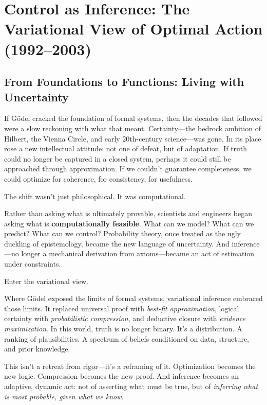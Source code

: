 






\section{Control as Inference: The Variational View of Optimal Action (1992--2003)}

\subsection{From Foundations to Functions: Living with Uncertainty}

If Gödel cracked the foundation of formal systems, then the decades that followed were a slow reckoning with what that meant. Certainty—the bedrock ambition of Hilbert, the Vienna Circle, and early 20th-century science—was gone. In its place rose a new intellectual attitude: not one of defeat, but of adaptation. If truth could no longer be captured in a closed system, perhaps it could still be approached through approximation. If we couldn’t guarantee completeness, we could optimize for coherence, for consistency, for usefulness.

The shift wasn’t just philosophical. It was computational.

Rather than asking what is ultimately provable, scientists and engineers began asking what is \textbf{computationally feasible}. What can we model? What can we predict? What can we control? Probability theory, once treated as the ugly duckling of epistemology, became the new language of uncertainty. And inference—no longer a mechanical derivation from axioms—became an act of estimation under constraints.

Enter the variational view.

Where Gödel exposed the limits of formal systems, variational inference embraced those limits. It replaced universal proof with \emph{best-fit approximation}, logical certainty with \emph{probabilistic compression}, and deductive closure with \emph{evidence maximization}. In this world, truth is no longer binary. It’s a distribution. A ranking of plausibilities. A spectrum of beliefs conditioned on data, structure, and prior knowledge.

This isn’t a retreat from rigor—it’s a reframing of it. Optimization becomes the new logic. Compression becomes the new proof. And inference becomes an adaptive, dynamic act: not of asserting what must be true, but of \textit{inferring what is most probable, given what we know}.

